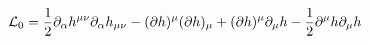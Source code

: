 \begin{equation}
{\cal L}_0 = \frac{1}{2} \partial_\alpha h^{\mu\nu} \partial_\alpha
h_{\mu\nu} - (\partial h)^\mu (\partial h)_\mu + (\partial h)^\mu
\partial_\mu h - \frac{1}{2} \partial^\mu h \partial_\mu h
\end{equation}

